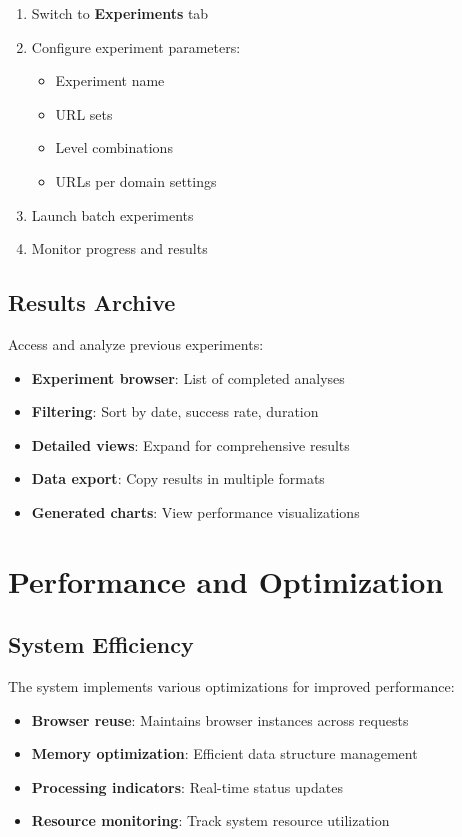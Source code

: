 \begin{enumerate}
    \item Switch to \textbf{Experiments} tab
    \item Configure experiment parameters:
        \begin{itemize}
            \item Experiment name
            \item URL sets
            \item Level combinations
            \item URLs per domain settings
        \end{itemize}
    \item Launch batch experiments
    \item Monitor progress and results
\end{enumerate}

\subsection{Results Archive}
\label{subsec:results-archive}

Access and analyze previous experiments:

\begin{itemize}
    \item \textbf{Experiment browser}: List of completed analyses
    \item \textbf{Filtering}: Sort by date, success rate, duration
    \item \textbf{Detailed views}: Expand for comprehensive results
    \item \textbf{Data export}: Copy results in multiple formats
    \item \textbf{Generated charts}: View performance visualizations
\end{itemize}

\section{Performance and Optimization}
\label{sec:performance-optimization}

\subsection{System Efficiency}
\label{subsec:system-efficiency}

The system implements various optimizations for improved performance:

\begin{itemize}
    \item \textbf{Browser reuse}: Maintains browser instances across requests
    \item \textbf{Memory optimization}: Efficient data structure management
    \item \textbf{Processing indicators}: Real-time status updates
    \item \textbf{Resource monitoring}: Track system resource utilization
\end{itemize}

